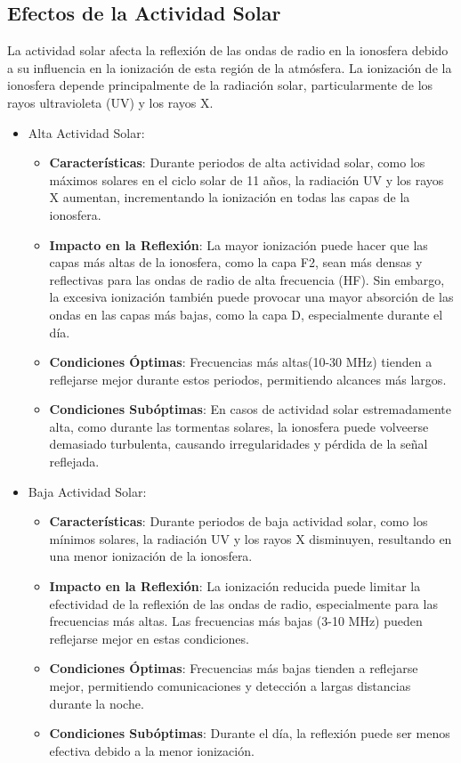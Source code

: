 \documentclass[12pt]{article}
\begin{document}
\subsection{Efectos de la Actividad Solar}
La actividad solar afecta la reflexión de las ondas de radio en la ionosfera debido a 
su influencia en la ionización de esta región de la atmósfera. La ionización de la 
ionosfera depende principalmente de la radiación solar, particularmente de los rayos 
ultravioleta (UV) y los rayos X.
\begin{itemize}
    \item Alta Actividad Solar:
        \begin{itemize}
            \item \textbf{Características}: Durante periodos de alta actividad solar, como 
            los máximos solares en el ciclo solar de 11 años, la radiación UV y los rayos 
            X aumentan, incrementando la ionización en todas las capas de la ionosfera.
            \item \textbf{Impacto en la Reflexión}: La mayor ionización puede hacer que las 
            capas más altas de la ionosfera, como la capa F2, sean más densas y reflectivas 
            para las ondas de radio de alta frecuencia (HF). Sin embargo, la excesiva ionización 
            también puede provocar una mayor absorción de las ondas en las capas más bajas, 
            como la capa D, especialmente durante el día.
            \item \textbf{Condiciones Óptimas}: Frecuencias más altas(10-30 MHz) tien\-den a reflejarse 
            mejor durante estos periodos, permitiendo alcances más largos.
            \item \textbf{Condiciones Subóptimas}: En casos de actividad solar estrema\-damente
            alta, como durante las tormentas solares, la ionosfera puede volveerse demasiado turbulenta, 
            causando irregularidades y pérdida de la señal reflejada.
        \end{itemize}
    \item Baja Actividad Solar:
        \begin{itemize}
            \item \textbf{Características}: Durante periodos de baja actividad solar, como los 
            mínimos solares, la radiación UV y los rayos X disminuyen, resultando en una menor 
            ionización de la ionosfera.
            \item \textbf{Impacto en la Reflexión}: La ionización reducida puede limitar la 
            efectividad de la reflexión de las ondas de radio, especialmente para las frecuencias 
            más altas. Las frecuencias más bajas (3-10 MHz) pueden reflejarse mejor en estas 
            condiciones.
            \item \textbf{Condiciones Óptimas}: Frecuencias más bajas tienden a reflejarse mejor, 
            permitiendo comunicaciones y detección a largas distancias durante la noche.
            \item \textbf{Condiciones Subóptimas}: Durante el día, la reflexión puede ser menos 
            efectiva debido a la menor ionización.
        \end{itemize}
\end{itemize}
\end{document}
